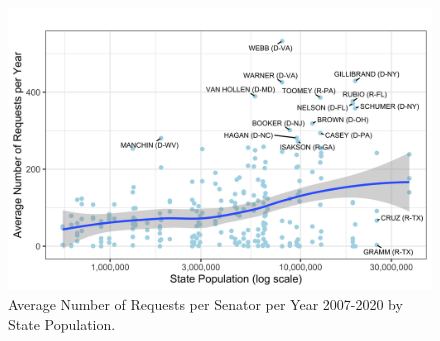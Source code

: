\documentclass[12pt]{article}
\begin{document}
\begin{figure}
\centering
\caption{Average Number of Requests per Senator per Year 2007-2020 by State Population.} \label{f:stateSize}
\includegraphics[width = \textwidth]{figs/pop-1}
\end{figure}



\end{document}
